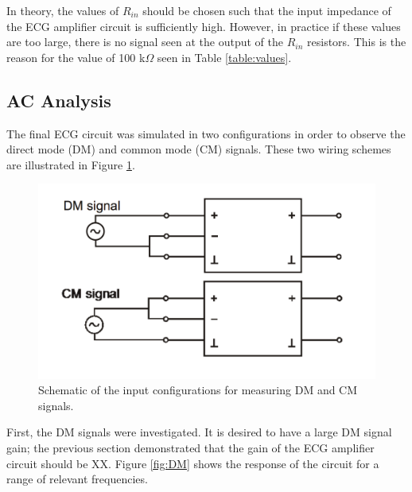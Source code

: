 \documentclass[pdftex,12pt,letterpaper]{article}
\begin{document}
In theory, the values of $R_{in}$ should be chosen such that the input impedance of the ECG amplifier circuit is sufficiently high. However, in practice if these values are too large, there is no signal seen at the output of the $R_{in}$ resistors. This is the reason for the value of 100 k$\Omega$ seen in Table \ref{table:values}.

\subsection{AC Analysis}

The final ECG circuit was simulated in two configurations in order to observe the direct mode (DM) and common mode (CM) signals. These two wiring schemes are illustrated in Figure \ref{fig:DM_CM}.

\begin{figure}[H]
\begin{center}
\includegraphics[scale=.5]{DM_CM.png}
\caption{Schematic of the input configurations for measuring DM and CM signals.}
\label{fig:DM_CM}
\end{center}
\end{figure}

First, the DM signals were investigated. It is desired to have a large DM signal gain; the previous section demonstrated that the gain of the ECG amplifier circuit should be XX. Figure \ref{fig:DM} shows the response of the circuit for a range of relevant frequencies. 
\end{document}
